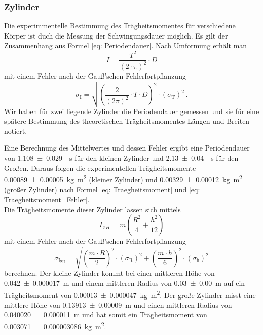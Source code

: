 \subsubsection*{Zylinder}
Die experimmentelle Bestimmung des Trägheitsmomentes für verschiedene Körper ist duch die Messung der Schwingungsdauer möglich.
Es gilt der Zusammenhang aus Formel \eqref{eq: Periodendauer}. Nach Umformung erhält man
\begin{equation} I = \frac{T^2}{(2 \cdot \pi)^2} \cdot D  \label{eq: Traegheitsmoment}\end{equation}
	mit einem Fehler nach der Gauß'schen Fehlerfortpflanzung
	\begin{equation}
		\sigma _\text{I} = \sqrt{ \left(\frac{2}{(2 \pi)^2}  \cdot T \cdot D \right)^2 \cdot (\sigma_\text{T})^2}  \ .
		\label{eq: Traegheitsmoment_Fehler}
	\end{equation}
Wir haben für zwei liegende Zylinder die Periodendauer gemessen und sie für eine spätere Bestimmung
des theoretischen Trägheitsmomentes Längen und Breiten notiert.


Eine Berechnung des Mittelwertes und dessen Fehler ergibt eine Periodendauer von \SI{1.108 \pm 0.029}{\per\second}
für den kleinen Zylinder und \SI{2,13 \pm 0,04}{\per\second} für den Großen. Daraus folgen die experimentellen Trägheitsmomente \SI{0,00089 \pm 0,00005}{\kilo\gram\meter\squared} (kleiner Zylinder) und \SI{0,00329 \pm 0,00012}{\kilo\gram\meter\squared}
(großer Zylinder) nach Formel \eqref{eq: Traegheitsmoment} und \eqref{eq: Traegheitsmoment_Fehler}. \\
Die Trägheitsmomente dieser Zylinder lassen sich mittels
\begin{equation}
	I_{ZH} = m \left(\frac{R^2}{4} + \frac{h^2}{12} \right)
\end{equation}
mit einem Fehler nach der Gauß'schen Fehlerfortpflanzung
\begin{equation}
	\sigma_{\text{I}_{\text{ZH}}} = \sqrt{\left(\frac{m \cdot R}{2} \right)^2 \cdot (\sigma_\text{R})^2
	+ \left(\frac{m \cdot h}{6} \right)^2 \cdot (\sigma_\text{h})^2}
\end{equation}
berechnen. Der kleine Zylinder kommt bei einer mittleren Höhe von \SI{0,042 \pm 0,000017}{\meter} und
einem mittleren Radius von \SI{0,03 \pm 0,00}{\meter} auf ein Trägheitsmoment von \SI{0,00013 \pm 0.000047}{\kilo\gram\meter\squared}.
Der große Zylinder misst eine mittlere Höhe von \SI{0,13913 \pm 0,00009}{\meter}
und einen mittleren Radius von \SI{0,040020 \pm 0.000011}{\meter} und hat somit ein
Trägheitsmoment von \SI{0,003071 \pm  0.000003086}{\kilo\gram\meter\squared}.


